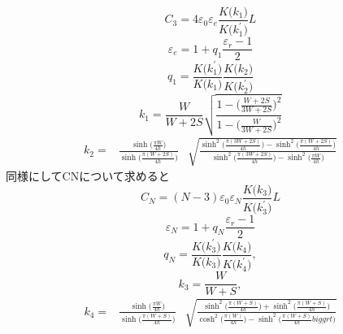\begin{equation}
    C_{3}=4 \varepsilon_{0} \varepsilon_{e} \frac{K\biggl(k_{1}\biggr)}{K\biggl(k_{1}^{\prime}\biggr)} L
\end{equation}\begin{equation}
    \varepsilon_{e}=1+q_{1} \frac{\varepsilon_{r}-1}{2}
\end{equation}
\begin{equation}
        q_{1}=\frac{K\biggl(k_{1}^{\prime}\biggr)}{K\biggl(k_{1}\biggr)} \frac{K\biggl(k_{2}\biggr)}{K\biggl(k_{2}^{\prime}\biggr)}
\end{equation}
\begin{equation}
    k_{1}=\frac{W}{W+2 S} \sqrt{\frac{1-\biggl(\frac{W+2 S}{3 W+2 S}\biggr)^{2}}{1-\biggl(\frac{W}{3 W+2 S}\biggr)^{2}}}
\end{equation}
\begin{equation}
    \begin{aligned}
    k_{2}=& \frac{\sinh \biggl(\frac{\pi W}{4 h}\biggr)}{\sinh \biggl(\frac{\pi(W+2 S)}{4 h}\biggr)} 
    & \sqrt{\frac{\sinh ^{2}\biggl(\frac{\pi(3 W+2 S)}{4 h}\biggr)-\sinh ^{2}\biggl(\frac{\pi(W+2 S)}{4 h}\biggr)}{\sinh ^{2}\biggl(\frac{\pi(3 W+2 S)}{4 h}\biggr)-\sinh ^{2}\biggl(\frac{\pi W}{4 h}\biggr)}}
    \end{aligned}
\end{equation}
同様にしてCNについて求めると
\begin{equation}
    C_{N}=(N-3) \varepsilon_{0} \varepsilon_{N} \frac{K\biggl(k_{3}\biggr)}{K\biggl(k_{3}^{\prime}\biggr)} L
\end{equation}
\begin{equation}
    \varepsilon_{N}=1+q_{N} \frac{\varepsilon_{r}-1}{2}
\end{equation}
\begin{equation}
    q_{N}=\frac{K\biggl(k_{3}^{\prime}\biggr)}{K\biggl(k_{3}\biggr)} \frac{K\biggl(k_{4}\biggr)}{K\biggl(k_{4}^{\prime}\biggr)},
\end{equation}
\begin{equation}
    k_{3}=\frac{W}{W+S},
\end{equation}
\begin{equation}
    \begin{aligned}
    k_{4}=& \frac{\sinh \biggl(\frac{\pi W}{4 h}\biggr)}{\sinh \biggl(\frac{\pi(W+ S)}{4 h}\biggr)} 
    & \sqrt{\frac{\sinh ^{2}\biggl(\frac{\pi(W+S)}{4 h}\biggr)+\sinh ^{2}\biggl(\frac{\pi(W+ S)}{4 h}\biggr)}{\cosh ^{2}\biggl(\frac{\pi(W)}{4 h}\biggr)-\sinh ^{2}\biggl(\frac{\pi (W+S)}{4 h}biggrt)}}
    \end{aligned}
\end{equation}
